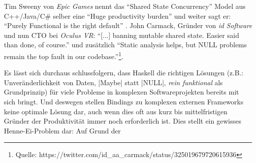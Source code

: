 
Tim Sweeny von \textit{Epic Games} nennt das "`Shared State Concurrency"' Model aus C++/Java/C\# selber eine "`Huge productivity burden"' und weiter sagt er: "`Purely Functional is the right default"' \parencite[Vgl.][Seite 42 u. Seite 56]{Sweeney2006}. John Carmack, Gründer von \textit{id Software} und nun CTO bei \textit{Oculus VR}: "`[...] banning mutable shared state. Easier said than done, of course."' und zusätzlich "`Static analysis helps, but NULL problems remain the top fault in our codebase."'\footnote{Quelle: https://twitter.com/id\_aa\_carmack/status/325019679720615936}.

Es lässt sich durchaus schlussfolgern, dass Haskell die richtigen Lösungen (z.B.: Unveränderlichkeit von Daten, |Maybe| statt |NULL|, \textit{rein funktional} als Grundprinzip) für viele Probleme in komplexen Softwareprojekten bereits mit sich bringt. Und deswegen stellen Bindings zu komplexen externen Frameworks keine optimale Lösung dar, auch wenn dies oft aus kurz bis mittelfristigen Gründer der Produktivität immer noch erforderlich ist. Dies stellt ein gewisses Henne-Ei-Problem dar: Auf Grund der 
